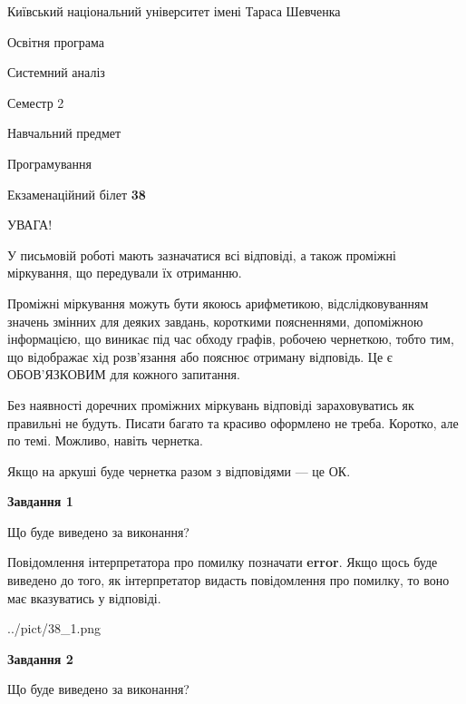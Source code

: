 \documentclass[12pt, ukrainian]{article}
\begin{document}
{{\begin {small}\par
{ \center  Київський національний університет імені Тараса Шевченка \par}
{\parbox {5 cm}{Освітня програма \hfill}{\parbox {7 cm}{Системний аналіз \hfill}}\parbox {6 cm}{\hfill Семестр 2}}\par
{\parbox {5 cm} {Навчальний предмет \hfill}\parbox {7 cm}{Програмування \hfill}\parbox {6cm}{\hfill}\par}\vspace{-7pt} \end{small}}{\center Екзаменаційний білет \No \textbf
{ 38 }\par}}
{
\begin {large}
УВАГА!

У письмовій роботі мають зазначатися всі відповіді, а також проміжні міркування, що передували їх отриманню.

Проміжні міркування можуть бути якоюсь арифметикою, відслідковуванням зна\-чень змінних для деяких завдань,
короткими поясненнями, допоміжною інформацією, що виникає під час обходу графів, робочею чернеткою,
тобто тим, що відображає хід розв’язання або пояснює отриману відповідь.
Це є ОБОВ’ЯЗКОВИМ для кожного запитання.

Без наявності доречних проміжних міркувань відповіді зараховуватись як правиль\-ні не будуть.
Писати багато та красиво оформлено не треба. Коротко, але по темі. Можли\-во, навіть чернетка.

Якщо на аркуші буде чернетка разом з відповідями --- це ОК.

\newpage

{\begin {center}\textbf{Завдання 1}\end {center}}\par
Що буде виведено за виконання?

Повідомлення інтерпретатора про помилку позначати \textbf{error}.
Якщо щось буде виведено до того, як інтерпретатор видасть повідомлення про помилку, 
то воно має вказуватись у відповіді. \par


\begin{center}
	{../pict/38_1.png}
\end{center}
\newpage

{\begin {center}\textbf{Завдання 2}\end {center}}\par
Що буде виведено за виконання?


\end{large}}
\end{document}
